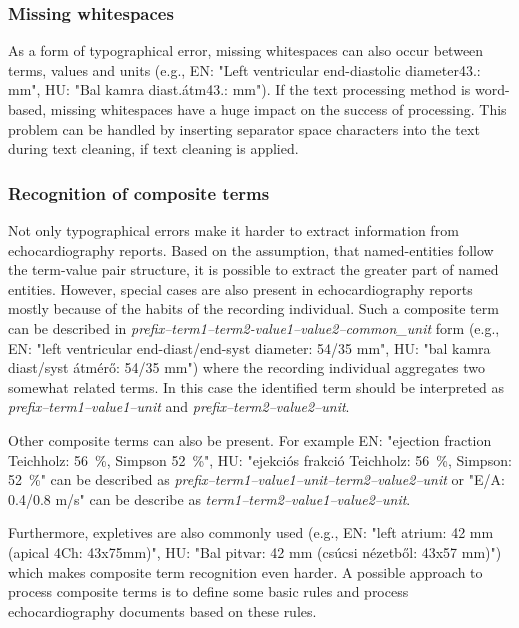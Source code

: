 \subsubsection*{Missing whitespaces}

As a form of typographical error, missing whitespaces can also occur between terms, values and units (e.g., EN: "Left ventricular end-diastolic diameter43.: mm", HU: "Bal kamra diast.átm43.: mm"). If the text processing method is word-based, missing whitespaces have a huge impact on the success of processing. This problem can be handled by inserting separator space characters into the text during text cleaning, if text cleaning is applied.

\subsubsection*{Recognition of composite terms}

Not only typographical errors make it harder to extract information from echocardiography reports. Based on the assumption, that named-entities follow the term-value pair structure, it is possible to extract the greater part of named entities. However, special cases are also present in echocardiography reports mostly because of the habits of the recording individual. Such a composite term can be described in \textit{prefix–term1–term2-value1–value2–common\_unit} form (e.g., EN: "left ventricular end-diast/end-syst diameter: 54/35 mm", HU: "bal kamra diast/syst átmérő: 54/35 mm") where the recording individual aggregates two somewhat related terms. In this case the identified term should be interpreted as \textit{prefix–term1–value1–unit} and \textit{prefix–term2–value2–unit}.

Other composite terms can also be present. For example EN: "ejection fraction Teichholz: \SI{56}{\percent}, Simpson \SI{52}{\percent}", HU: "ejekciós frakció Teichholz: \SI{56}{\percent}, Simpson: \SI{52}{\percent}" can be described as \textit{prefix–term1–value1–unit–term2–value2–unit} or "E/A: 0.4/0.8 m/s" can be describe as \textit{term1–term2–value1–value2–unit}.

Furthermore, expletives are also commonly used (e.g., EN: "left atrium: 42 mm (apical 4Ch: 43x75mm)", HU: "Bal pitvar: 42 mm (csúcsi nézetből: 43x57 mm)") which makes composite term recognition even harder. A possible approach to process composite terms is to define some basic rules and process echocardiography documents based on these rules.



